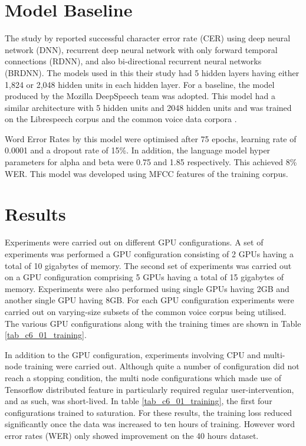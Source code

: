 \section{Model Baseline}
The study by \cite{hannun2014first} reported successful character error rate (CER)  using deep neural network (DNN), recurrent deep neural network with only forward temporal connections (RDNN), and also bi-directional recurrent neural networks (BRDNN). The models used in this their study had 5 hidden layers having either 1,824 or 2,048 hidden units in each hidden layer.  For a baseline, the model produced by the Mozilla DeepSpeech team was adopted.  This model had a similar architecture with 5 hidden units and 2048 hidden units and was trained on the Librespeech corpus and the common voice data corpora \citep{panayotov2015librispeech, mozilla/deepspeech_2019}.

Word Error Rates by this model were optimised after 75 epochs, learning rate of 0.0001 and a dropout rate of 15\%.  In addition, the language model hyper parameters for alpha and beta were 0.75 and 1.85 respectively.  This achieved 8\% WER. This model was developed using MFCC features of the training corpus.

\section{Results}
Experiments were carried out on different GPU configurations. A set of experiments was performed a GPU configuration consisting of 2 GPUs having a total of 10 gigabytes of memory. The second set of experiments was carried out on a GPU configuration comprising 5 GPUs having a total of 15 gigabytes of memory. Experiments were also performed using single GPUs having 2GB and another single GPU having 8GB.  For each GPU configuration experiments were carried out on varying-size subsets of the common voice corpus being utilised.   The various GPU configurations along with the training times are shown in Table \ref{tab_c6_01_training}.

In addition to the GPU configuration, experiments involving CPU and multi-node training were carried out.  Although quite a number of configuration did not reach a stopping condition, the multi node configurations which made use of Tensorflow distributed feature in particularly required regular user-intervention, and as such, was short-lived. In table \ref{tab_c6_01_training}, the first four configurations trained to saturation.  For these results, the training loss reduced significantly once the data was increased to ten hours of training.  However word error rates (WER) only showed improvement on the 40 hours dataset.

